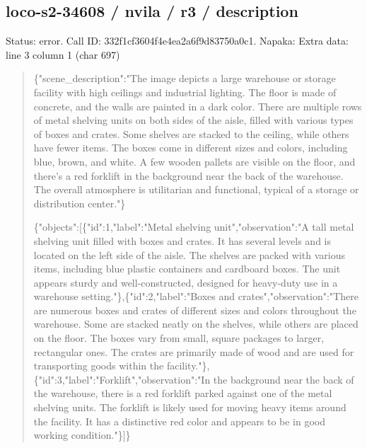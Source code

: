 \documentclass[10pt,a4paper]{article}
\begin{document}
\subsection*{loco-s2-34608 / nvila / r3 / description}
Status: error. Call ID: 332f1cf3604f4e4ea2a6f9d83750a0c1. Napaka: Extra data: line 3 column 1 (char 697)
\begin{quote}\footnotesize
\{"scene\_description":\allowbreak{}"The image depicts a large warehouse or storage facility with high ceilings and industrial lighting. The floor is made of concrete,\allowbreak{} and the walls are painted in a dark color. There are multiple rows of metal shelving units on both sides of the aisle,\allowbreak{} filled with various types of boxes and crates. Some shelves are stacked to the ceiling,\allowbreak{} while others have fewer items. The boxes come in different sizes and colors,\allowbreak{} including blue,\allowbreak{} brown,\allowbreak{} and white. A few wooden pallets are visible on the floor,\allowbreak{} and there's a red forklift in the background near the back of the warehouse. The overall atmosphere is utilitarian and functional,\allowbreak{} typical of a storage or distribution center."\}\par
\par
\{"objects":\allowbreak{}[\{"id":\allowbreak{}1,\allowbreak{}"label":\allowbreak{}"Met\allowbreak{}al shelving unit",\allowbreak{}"observation":\allowbreak{}"A tall metal shelving unit filled with boxes and crates. It has several levels and is located on the left side of the aisle. The shelves are packed with various items,\allowbreak{} including blue plastic containers and cardboard boxes. The unit appears sturdy and well-constructed,\allowbreak{} designed for heavy-duty use in a warehouse setting."\},\allowbreak{}\{"id":\allowbreak{}2,\allowbreak{}"label":\allowbreak{}"Boxe\allowbreak{}s and crates",\allowbreak{}"observation":\allowbreak{}"There are numerous boxes and crates of different sizes and colors throughout the warehouse. Some are stacked neatly on the shelves,\allowbreak{} while others are placed on the floor. The boxes vary from small,\allowbreak{} square packages to larger,\allowbreak{} rectangular ones. The crates are primarily made of wood and are used for transporting goods within the facility."\},\allowbreak{}\{"id":\allowbreak{}3,\allowbreak{}"label":\allowbreak{}"For\allowbreak{}klift",\allowbreak{}"observation":\allowbreak{}"In the background near the back of the warehouse,\allowbreak{} there is a red forklift parked against one of the metal shelving units. The forklift is likely used for moving heavy items around the facility. It has a distinctive red color and appears to be in good working condition."\}]\}
\end{quote}
\end{document}
